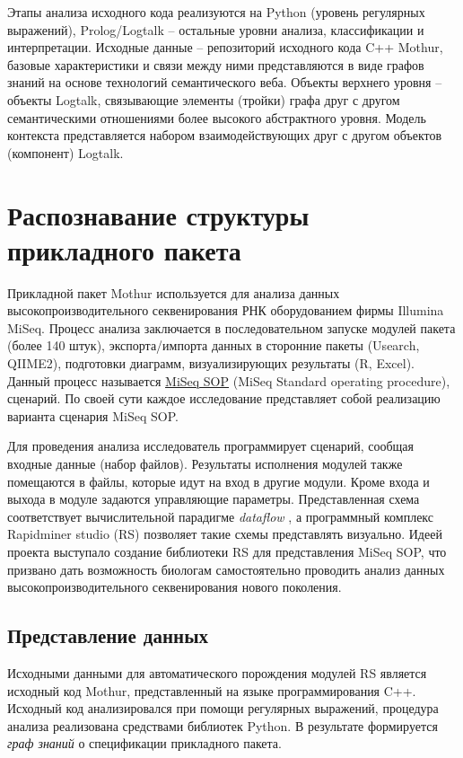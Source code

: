 \documentclass[12pt]{article}
\begin{document}
Этапы анализа исходного кода реализуются на Python (уровень регулярных
выражений), Prolog/Logtalk \cite{logtalk} -- остальные уровни анализа, классификации и
интерпретации. Исходные данные -- репозиторий исходного кода C++ Mothur,
базовые характеристики и связи между ними представляются в виде графов
знаний на основе технологий семантического веба. Объекты верхнего уровня
-- объекты Logtalk, связывающие элементы (тройки) графа друг с другом
семантическими отношениями более высокого абстрактного уровня. Модель
контекста представляется набором взаимодействующих друг с другом
объектов (компонент) Logtalk.

\section{Распознавание структуры прикладного пакета}

Прикладной пакет Mothur используется для анализа данных высокопроизводительного секвенирования РНК оборудованием фирмы Illumina MiSeq.  Процесс анализа заключается в последовательном запуске модулей пакета (более 140 штук), экспорта/импорта данных в сторонние пакеты (Usearch, QIIME2), подготовки диаграмм, визуализирующих результаты (R, Excel).  Данный процесс называется \href{https://mothur.org/wiki/miseq_sop/}{MiSeq SOP} (MiSeq Standard operating procedure), сценарий.  По своей сути каждое исследование представляет собой реализацию варианта сценария MiSeq SOP.

Для проведения анализа исследователь программирует сценарий, сообщая входные данные (набор файлов).  Результаты исполнения модулей также помещаются в файлы, которые идут на вход в другие модули.  Кроме входа и выхода в модуле задаются управляющие параметры.  Представленная схема соответствует вычислительной парадигме \emph{dataflow} \cite{dataflow}, а программный комплекс Rapidminer studio (RS) позволяет такие схемы представлять визуально.  Идеей проекта \cite{zont19} выступало создание библиотеки RS для представления MiSeq SOP, что призвано дать возможность биологам самостоятельно проводить анализ данных высокопроизводительного секвенирования нового поколения.

\subsection{Представление данных}

Исходными данными для автоматического порождения модулей RS является исходный код Mothur, представленный на языке программирования C++.  Исходный код анализировался при помощи регулярных выражений, процедура анализа реализована средствами библиотек Python.  В результате формируется \emph{граф знаний} \cite{kg} о спецификации прикладного пакета.
\end{document}
